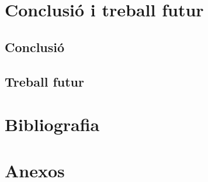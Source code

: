 \newpage
\section{Conclusió i treball futur}

\subsection{Conclusió}

\subsection{Treball futur}



\newpage
\section{Bibliografia}

\newpage
\section{Anexos}










